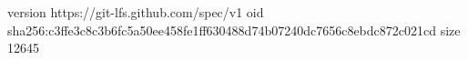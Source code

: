 version https://git-lfs.github.com/spec/v1
oid sha256:c3ffe3c8c3b6fc5a50ee458fe1ff630488d74b07240dc7656c8ebdc872c021cd
size 12645
